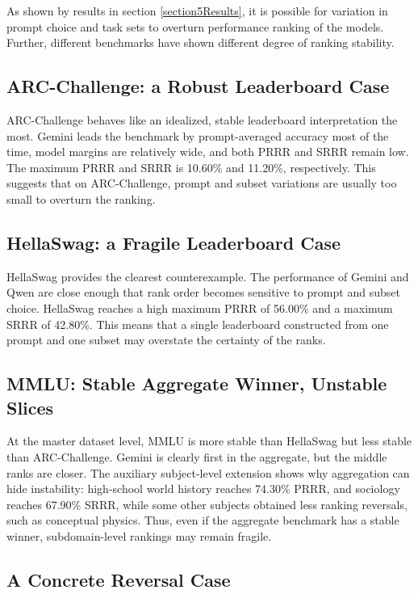 \documentclass[11pt]{article}
\theoremstyle{definition}
\begin{document}
As shown by results in section \ref{section5Results}, it is possible for variation in prompt choice and task sets to overturn performance ranking of the models. Further, different benchmarks have shown different degree of ranking stability.

\subsection{ARC-Challenge: a Robust Leaderboard Case}

ARC-Challenge behaves like an idealized, stable leaderboard interpretation the most. Gemini leads the benchmark by prompt-averaged accuracy most of the time, model margins are relatively wide, and both PRRR and SRRR remain low. The maximum PRRR and SRRR is 10.60\% and 11.20\%, respectively. This suggests that on ARC-Challenge, prompt and subset variations are usually too small to overturn the ranking.

\subsection{HellaSwag: a Fragile Leaderboard Case}

HellaSwag provides the clearest counterexample. The performance of Gemini and Qwen are close enough that rank order becomes sensitive to prompt and subset choice. HellaSwag reaches a high maximum PRRR of 56.00\% and a maximum SRRR of 42.80\%. This means that a single leaderboard constructed from one prompt and one subset may overstate the certainty of the ranks.

\subsection{MMLU: Stable Aggregate Winner, Unstable Slices}

At the master dataset level, MMLU is more stable than HellaSwag but less stable than ARC-Challenge. Gemini is clearly first in the aggregate, but the middle ranks are closer. The auxiliary subject-level extension shows why aggregation can hide instability: high-school world history reaches 74.30\% PRRR, and sociology reaches 67.90\% SRRR, while some other subjects obtained less ranking reversals, such as conceptual physics. Thus, even if the aggregate benchmark has a stable winner, subdomain-level rankings may remain fragile.

\subsection{A Concrete Reversal Case}
\end{document}
